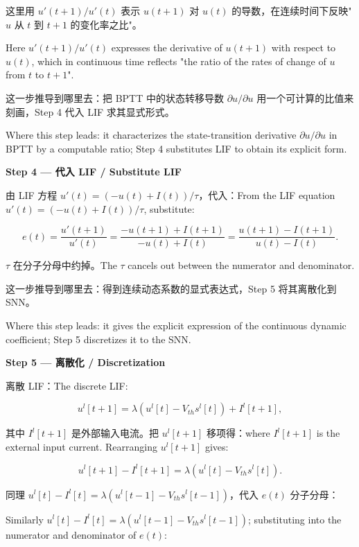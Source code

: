 \documentclass[journal,12pt,onecolumn]{IEEEtran}
\begin{document}
这里用 $u'(t+1)/u'(t)$ 表示 $u(t+1)$ 对 $u(t)$ 的导数，在连续时间下反映"$u$ 从 $t$ 到 $t+1$ 的变化率之比"。

Here $u'(t+1)/u'(t)$ expresses the derivative of $u(t+1)$ with respect to $u(t)$, which in continuous time reflects "the ratio of the rates of change of $u$ from $t$ to $t+1$".

这一步推导到哪里去：把 BPTT 中的状态转移导数 $\partial u/\partial u$ 用一个可计算的比值来刻画，Step 4 代入 LIF 求其显式形式。

Where this step leads: it characterizes the state-transition derivative $\partial u/\partial u$ in BPTT by a computable ratio; Step 4 substitutes LIF to obtain its explicit form.

\medskip\noindent\textbf{Step 4 — 代入 LIF / Substitute LIF}

由 LIF 方程 $u'(t)=(-u(t)+I(t))/\tau$，代入：From the LIF equation $u'(t)=(-u(t)+I(t))/\tau$, substitute:

\begin{equation}
e(t) = \frac{u'(t+1)}{u'(t)} = \frac{-u(t+1) + I(t+1)}{-u(t) + I(t)} = \frac{u(t+1) - I(t+1)}{u(t) - I(t)}.
\end{equation}

$\tau$ 在分子分母中约掉。The $\tau$ cancels out between the numerator and denominator.

这一步推导到哪里去：得到连续动态系数的显式表达式，Step 5 将其离散化到 SNN。

Where this step leads: it gives the explicit expression of the continuous dynamic coefficient; Step 5 discretizes it to the SNN.

\medskip\noindent\textbf{Step 5 — 离散化 / Discretization}

离散 LIF：The discrete LIF:

\begin{equation}
u^l[t+1] = \lambda (u^l[t] - V_{th} s^l[t]) + I^l[t+1],
\end{equation}

其中 $I^l[t+1]$ 是外部输入电流。把 $u^l[t+1]$ 移项得：where $I^l[t+1]$ is the external input current. Rearranging $u^l[t+1]$ gives:

\begin{equation}
u^l[t+1] - I^l[t+1] = \lambda (u^l[t] - V_{th} s^l[t]).
\end{equation}

同理 $u^l[t]-I^l[t]=\lambda(u^l[t-1]-V_{th}s^l[t-1])$，代入 $e(t)$ 分子分母：

Similarly $u^l[t]-I^l[t]=\lambda(u^l[t-1]-V_{th}s^l[t-1])$; substituting into the numerator and denominator of $e(t)$:
\end{document}

